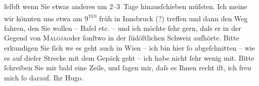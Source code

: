 \begin{ledgroupsized}[t]{13cm}
               ſelbſt wenn Sie etwas anderes um 2–3 Tage hinausſchieben müſsten. Ich meine wir
               könnten uns etwa am 9\textsc{\textsuperscript{ten}} früh in Innsbruck (?) treffen und dann den
               Weg fahren, den Sie wollen – Baſel etc. – und ich
               möchte ſehr gern, daſs er in der Gegend von \textsc{Maloja}oder ſonſtwo in der ſüdöſtlichen
                  Schweiz aufhörte. Bitte erkundigen Sie ſich
                  we{\geminationn} es geht auch in Wien – ich bin hier ſo abgeſchnitten – wie es auf dieſer Strecke mit dem
               Gepäck geht – ich habe nicht ſehr wenig mit. Bitte ſchreiben Sie mir bald eine Zeile,
               und ſagen mir, daſs es Ihnen recht iſt, ich freu mich ſo darauf. Ihr
                  \spacefill\mbox{Hugo.}\pend
           
         
         \endnumbering{}\end{ledgroupsized}  \newcommand{\dateiname}{L00810}\newcommand{\titel}{Hugo von Hofmannsthal an Arthur Schnitzler, 2. 7. [1898]}\newcommand{\editorInnen}{Martin Anton Müller und Gerd-Hermann Susen}
      